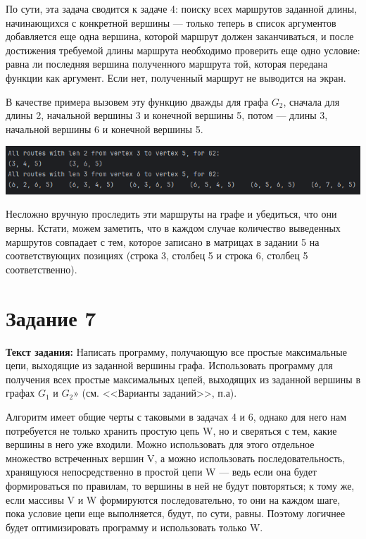 \documentclass[12pt]{article}
\begin{document}
	По сути, эта задача сводится к задаче 4: поиску всех маршрутов заданной длины, начинающихся с конкретной вершины --- только теперь в список аргументов добавляется еще одна вершина, которой маршрут должен заканчиваться, и после достижения требуемой длины маршрута необходимо проверить еще одно условие: равна ли последняя вершина полученного маршрута той, которая передана функции как аргумент. Если нет, полученный маршрут не выводится на экран.
	
	В качестве примера вызовем эту функцию дважды для графа $G_2$, сначала для длины 2, начальной вершины 3 и конечной вершины 5, потом --- длины 3, начальной вершины 6 и конечной вершины 5.
	
	
	\includegraphics[width=180mm]{images/ex6.png} 
	
	Несложно вручную проследить эти маршруты на графе и убедиться, что они верны. Кстати, можем заметить, что в каждом случае количество выведенных маршрутов совпадает с тем, которое записано в матрицах в задании 5 на соответствующих позициях (строка 3, столбец 5 и строка 6, столбец 5 соответственно).
	
	\section{Задание 7}
	\label{task7}
	
	{\bf Текст задания:} Написать программу, получающую все простые максимальные цепи, выходящие из заданной вершины графа. Использовать программу для получения всех простые максимальных цепей, выходящих из заданной вершины в графах $G_1$ и $G_2$» (см. <<Варианты заданий>>, п.а).
	
	Алгоритм имеет общие черты с таковыми в задачах 4 и 6, однако для него нам потребуется не только хранить простую цепь W, но и сверяться с тем, какие вершины в него уже входили. Можно использовать для этого отдельное множество встреченных вершин V, а можно использовать последовательность, хранящуюся непосредственно в простой цепи W --- ведь если она будет формироваться по правилам, то вершины в ней не будут повторяться; к тому же, если массивы V и W формируются последовательно, то они на каждом шаге, пока условие цепи еще выполняется, будут, по сути, равны. Поэтому логичнее будет оптимизировать программу и использовать только W. 
	
\end{document}
